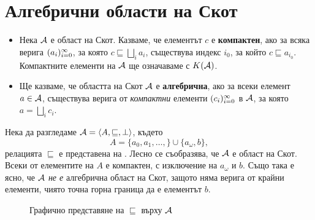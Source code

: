 \section{Алгебрични области на Скот}


\begin{itemize}
\item 
  Нека $\mathcal{A}$ е област на Скот.
  Казваме, че елементът $c$ е {\bf компактен}, ако 
  за всяка верига $(a_{i})^{\infty}_{i=0}$, за която $c \sqsubseteq \bigsqcup_i a_i$,
  съществува индекс $i_0$, за който $c \sqsubseteq a_{i_0}$.
  Компактните елементи на $\mathcal{A}$ ще означаваме с $K(\mathcal{A})$.
\item
  Ще казваме, че областта на Скот $\mathcal{A}$ е {\bf алгебрична}, ако за всеки елемент $a \in \mathcal{A}$,
  съществува верига от {\em компактни} елементи $(c_{i})^{\infty}_{i=0}$ в $\mathcal{A}$, за която $a = \bigsqcup_i c_i$.
\end{itemize}

\begin{example}
  Нека да разгледаме $\mathcal{A} = \langle{A,\sqsubseteq, \bot}\rangle$,
  където 
  \[A = \{a_0,a_1,\dots,\} \cup \{a_\omega, b\},\]
  релацията $\sqsubseteq$ е представена на .
  Лесно се съобразява, че $\mathcal{A}$ е област на Скот.
  Всеки от елементите на $A$ е компактен, с изключение на $a_\omega$ и $b$.
  Също така е ясно, че $\mathcal{A}$ {\em не е} алгебрична област на Скот, защото 
  няма верига от крайни елементи, чиято точна горна граница да е елементът $b$.
  \begin{framed}
    \begin{figure}[H]
    \centering
    \caption{Графично представяне на $\sqsubseteq$ върху $\mathcal{A}$}
    \label{fig:noncompact-element}
  \end{figure}
\end{framed}
\end{example}

